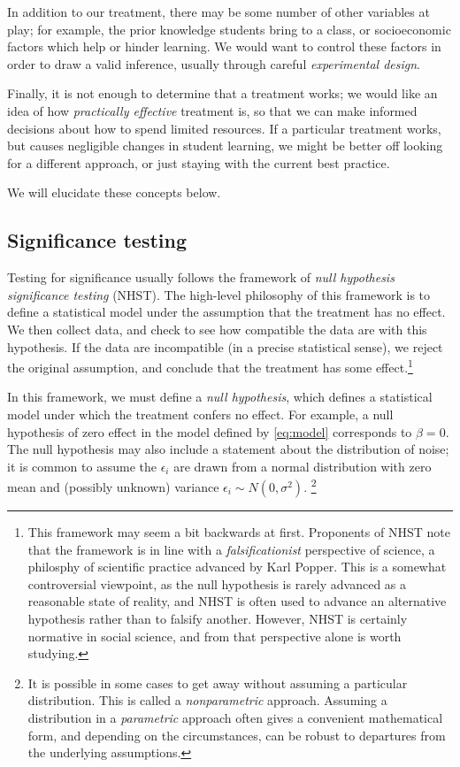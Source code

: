 \documentclass{tufte-handout}
\begin{document}
In addition to our treatment, there may be some number of other variables at
play; for example, the prior knowledge students bring to a class, or
socioeconomic factors which help or hinder learning. We would want to control
these factors in order to draw a valid inference, usually through careful
\emph{experimental design}.

Finally, it is not enough to determine that a treatment works; we would like an
idea of how \emph{practically effective} treatment is, so that we can make informed
decisions about how to spend limited resources. If a particular treatment works,
but causes negligible changes in student learning, we might be better off
looking for a different approach, or just staying with the current best
practice.


We will elucidate these concepts below.
\subsection{Significance testing}
\label{sec:orgb337974}
Testing for significance usually follows the framework of \emph{null hypothesis
significance testing} (NHST). The high-level philosophy of this framework is to
define a statistical model under the assumption that the treatment has no
effect. We then collect data, and check to see how compatible the data are with
this hypothesis. If the data are incompatible (in a precise statistical sense),
we reject the original assumption, and conclude that the treatment has some
effect.\footnote{This framework may seem a bit backwards at first. Proponents of NHST
note that the framework is in line with a \emph{falsificationist} perspective of
science, a philosphy of scientific practice advanced by Karl
Popper.\cite{popper2005logic} This is a somewhat controversial viewpoint, as the
null hypothesis is rarely advanced as a reasonable state of reality, and NHST is
often used to advance an alternative hypothesis rather than to falsify another.
However, NHST is certainly normative in social science, and from that
perspective alone is worth studying.}

In this framework, we must define a \emph{null hypothesis}, which defines a
statistical model under which the treatment confers no effect. For example, a
null hypothesis of zero effect in the model defined by \eqref{eq:model}
corresponds to \(\beta=0\). The null hypothesis may also include a statement about
the distribution of noise; it is common to assume the \(\epsilon_i\) are drawn
from a normal distribution with zero mean and (possibly unknown) variance
\(\epsilon_i\sim N(0,\sigma^2)\). \footnote{It is possible in some cases to get away
without assuming a particular distribution. This is called a \emph{nonparametric}
approach. Assuming a distribution in a \emph{parametric} approach often gives a
convenient mathematical form, and depending on the circumstances, can be robust
to departures from the underlying assumptions.}
\end{document}
